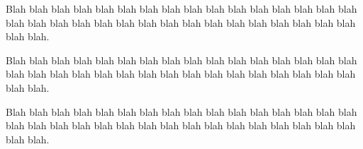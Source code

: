 \documentclass[rd,pdfa]{drdc-report}
\begin{document}
Blah blah blah blah blah blah blah blah blah blah blah blah blah blah
blah blah blah blah blah blah blah blah blah blah blah blah blah blah
blah blah blah blah blah blah.



Blah blah blah blah blah blah blah blah blah blah blah blah blah blah
blah blah blah blah blah blah blah blah blah blah blah blah blah blah
blah blah blah blah blah blah.

Blah blah blah blah blah blah blah blah blah blah blah blah blah blah
blah blah blah blah blah blah blah blah blah blah blah blah blah blah
blah blah blah blah blah blah.
\docctl

\makebackcover



\end{document}
